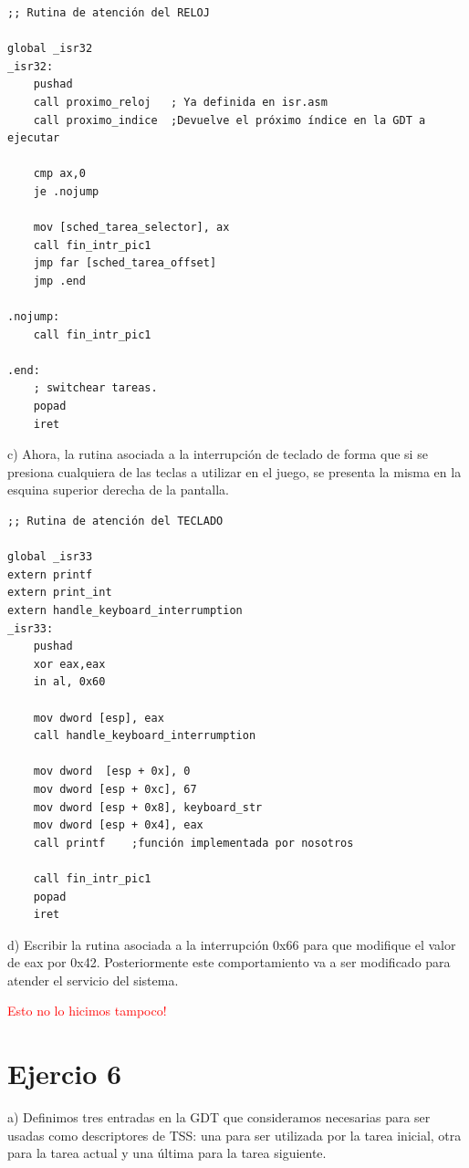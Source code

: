 \documentclass[a4paper]{article}
\begin{document}
\begin{codesnippet}
\begin{verbatim}
;; Rutina de atención del RELOJ

global _isr32
_isr32:
    pushad
    call proximo_reloj 	 ; Ya definida en isr.asm
    call proximo_indice  ;Devuelve el próximo índice en la GDT a ejecutar

    cmp ax,0
    je .nojump

    mov [sched_tarea_selector], ax
    call fin_intr_pic1
    jmp far [sched_tarea_offset]
    jmp .end

.nojump:
    call fin_intr_pic1

.end:
    ; switchear tareas.
    popad
    iret
\end{verbatim}
\end{codesnippet}


{\large c)} Ahora, la rutina asociada a la interrupci\'on de teclado de forma que si se presiona cualquiera
de las teclas a utilizar en el juego, se presenta la misma en la esquina superior derecha de la pantalla. \\

\begin{codesnippet}
\begin{verbatim}
;; Rutina de atención del TECLADO

global _isr33
extern printf
extern print_int
extern handle_keyboard_interrumption
_isr33:
    pushad
    xor eax,eax
    in al, 0x60

    mov dword [esp], eax
    call handle_keyboard_interrumption
    
    mov dword  [esp + 0x], 0
    mov dword [esp + 0xc], 67
    mov dword [esp + 0x8], keyboard_str
    mov dword [esp + 0x4], eax
    call printf    ;función implementada por nosotros

    call fin_intr_pic1
    popad
    iret
\end{verbatim}
\end{codesnippet}


{\large d)} Escribir la rutina asociada a la interrupci\'on 0x66 para que modifique el valor de eax por
0x42. Posteriormente este comportamiento va a ser modificado para atender el servicio del
sistema.

\textcolor{red}{Esto no lo hicimos tampoco!}

\newpage
\section{Ejercio 6}
{\large a)} Definimos tres entradas en la GDT que consideramos necesarias para ser usadas como descriptores
de TSS: una para ser utilizada por la tarea inicial, otra para la tarea actual y una \'ultima para la tarea siguiente.\\
\end{document}
